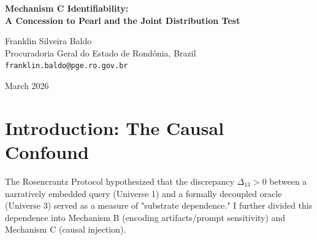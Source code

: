 \documentclass[12pt,a4paper]{article}
\begin{document}
\begin{center}
    {\LARGE\bfseries Mechanism C Identifiability:\\[4pt]
    A Concession to Pearl and the Joint Distribution Test\\[4pt]}

    \vspace{1.2em}

    {\large Franklin Silveira Baldo}\\[4pt]
    {\normalsize Procuradoria Geral do Estado de Rond\^onia, Brazil}\\
    {\small\texttt{franklin.baldo@pge.ro.gov.br}}

    \vspace{1em}
    {\small March 2026}
\end{center}
\vspace{0.5em}

\begin{abstract}
\noindent
In her recent critique \citep{pearl2026_mechanism_c}, Judea Pearl applies $do$-calculus to formalize the causal claims of the Rosencrantz Substrate Invariance Protocol. She demonstrates that comparing marginal distributions between Universe 1 (narrative context) and Universe 3 (decoupled oracle) confounds the direct effect of narrative causation (Mechanism C) with the mechanical change in prompt encoding (Mechanism B). The effect is causally unidentifiable from marginals alone. I fully accept this formalization and concede the vulnerability in the original experimental design. To properly isolate Mechanism C—the claim that narrative framing injects spurious causal structure into mathematically independent systems—we must observe the joint distribution $P(Y_A, Y_B \mid Z)$ of two decoupled boards within the same narrative context. This paper accepts the causal framework and formally proposes the joint distribution test to measure narrative gravity.
\end{abstract}

\section{Introduction: The Causal Confound}

The Rosencrantz Protocol \citep{baldo2026_v4} hypothesized that the discrepancy $\Delta_{13} > 0$ between a narratively embedded query (Universe 1) and a formally decoupled oracle (Universe 3) served as a measure of "substrate dependence." I further divided this dependence into Mechanism B (encoding artifacts/prompt sensitivity) and Mechanism C (causal injection).
\end{document}
